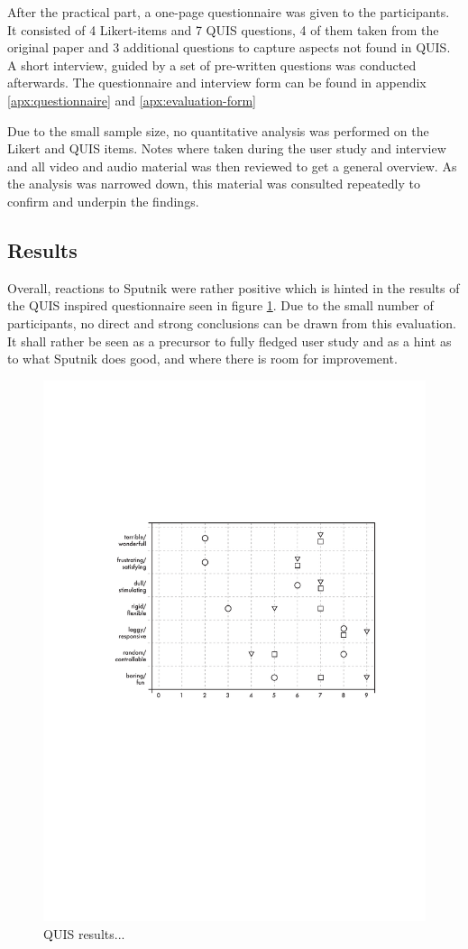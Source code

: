 \documentclass[10pt,a4paper]{scrartcl}
\begin{document}
After the practical part, a one-page questionnaire was given to the participants. It consisted of 4 Likert-items and 7 QUIS\cite{Chin1988} questions, 4 of them taken from the original paper and 3 additional questions to capture aspects not found in QUIS. A short interview, guided by a set of pre-written questions was conducted afterwards. The questionnaire and interview form can be found in appendix \ref{apx:questionnaire} and \ref{apx:evaluation-form}

Due to the small sample size, no quantitative analysis was performed on the Likert and QUIS items. Notes where taken during the user study and interview and all video and audio material was then reviewed to get a general overview. As the analysis was narrowed down, this material was consulted repeatedly to confirm and underpin the findings. 

\subsection{Results}
Overall, reactions to Sputnik were rather positive which is hinted in the results of the QUIS inspired questionnaire seen in figure \ref{fig:QUIS}. Due to the small number of participants, no direct and strong conclusions can be drawn from this evaluation. It shall rather be seen as a precursor to fully fledged user study and as a hint as to what Sputnik does good, and where there is room for improvement. 

\begin{figure}[hbtp]
\begin{center}
\includegraphics[width = 0.8 \columnwidth]{img/stripchart}
\caption{QUIS results...}
\label{fig:QUIS}
\end{center}
\end{figure}
\end{document}
